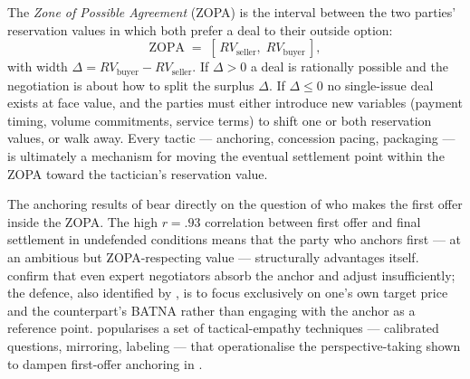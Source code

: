 The \emph{Zone of Possible Agreement} (ZOPA) is the interval between the two parties'
reservation values in which both prefer a deal to their outside option:
\begin{equation}\label{eq:zopa}
  \mathrm{ZOPA} \;=\; [\,RV_{\text{seller}},\; RV_{\text{buyer}}\,],
\end{equation}
with width \(\Delta = RV_{\text{buyer}} - RV_{\text{seller}}\). If \(\Delta > 0\) a deal
is rationally possible and the negotiation is about how to split the surplus \(\Delta\).
If \(\Delta \leq 0\) no single-issue deal exists at face value, and the parties must either
introduce new variables (payment timing, volume commitments, service terms) to shift one
or both reservation values, or walk away. Every tactic --- anchoring, concession pacing,
packaging --- is ultimately a mechanism for moving the eventual settlement point within
the ZOPA toward the tactician's reservation value.

The anchoring results of \textcite{galinsky2001anchoring} bear directly on the question of
who makes the first offer inside the ZOPA. The high $r = .93$ correlation between first
offer and final settlement in undefended conditions means that the party who anchors first
--- at an ambitious but ZOPA-respecting value --- structurally advantages itself.
\textcite{northcraft1987anchoring} confirm that even expert negotiators absorb the anchor
and adjust insufficiently; the defence, also identified by \textcite{galinsky2001anchoring},
is to focus exclusively on one's own target price and the counterpart's BATNA rather than
engaging with the anchor as a reference point.
\textcite{voss2016never} popularises a set of tactical-empathy techniques --- calibrated questions, mirroring, labeling --- that operationalise the perspective-taking shown to dampen first-offer anchoring in \textcite{galinsky2001anchoring}.

